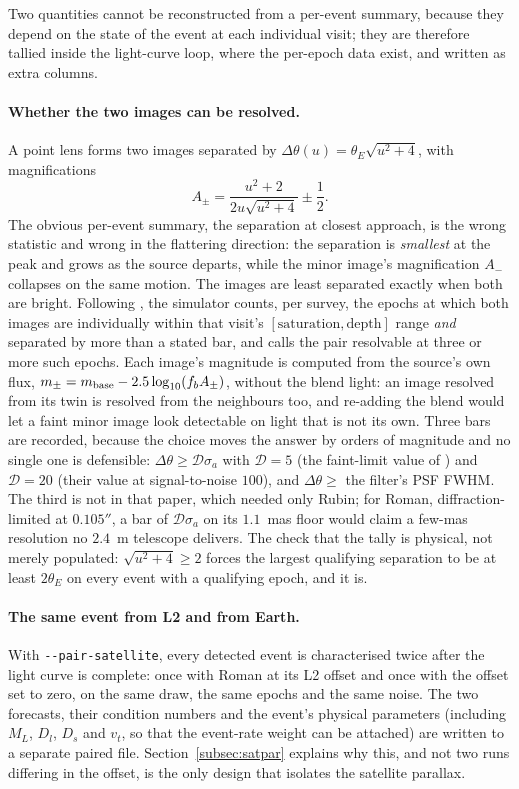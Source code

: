 \documentclass[english,10pt,a4paper]{article}
\begin{document}
	Two quantities cannot be reconstructed from a per-event summary, because they depend on the state of the event at each individual visit; they are therefore tallied inside the light-curve loop, where the per-epoch data exist, and written as extra columns.

	\paragraph{Whether the two images can be resolved.} A point lens forms two images separated by $\Delta\theta(u) = \theta_E\sqrt{u^2+4}$, with magnifications
	\[
		A_\pm = \frac{u^2+2}{2u\sqrt{u^2+4}} \pm \frac{1}{2} .
	\]
	The obvious per-event summary, the separation at closest approach, is the wrong statistic and wrong in the flattering direction: the separation is \emph{smallest} at the peak and grows as the source departs, while the minor image's magnification $A_-$ collapses on the same motion. The images are least separated exactly when both are bright. Following \cite{SajadianMakler2026}, the simulator counts, per survey, the epochs at which both images are individually within that visit's $[\text{saturation}, \text{depth}]$ range \emph{and} separated by more than a stated bar, and calls the pair resolvable at three or more such epochs. Each image's magnitude is computed from the source's own flux, $m_\pm = m_{\rm base} - 2.5\log_{10}(f_b A_\pm)$, without the blend light: an image resolved from its twin is resolved from the neighbours too, and re-adding the blend would let a faint minor image look detectable on light that is not its own. Three bars are recorded, because the choice moves the answer by orders of magnitude and no single one is defensible: $\Delta\theta \ge \mathcal{D}\sigma_a$ with $\mathcal{D} = 5$ (the faint-limit value of \cite{SajadianMakler2026}) and $\mathcal{D} = 20$ (their value at signal-to-noise $100$), and $\Delta\theta \ge$ the filter's PSF FWHM. The third is not in that paper, which needed only Rubin; for Roman, diffraction-limited at $0.105''$, a bar of $\mathcal{D}\sigma_a$ on its $1.1$~mas floor would claim a few-mas resolution no $2.4$~m telescope delivers. The check that the tally is physical, not merely populated: $\sqrt{u^2+4}\ge2$ forces the largest qualifying separation to be at least $2\theta_E$ on every event with a qualifying epoch, and it is.

	\paragraph{The same event from L2 and from Earth.} With \texttt{-{}-pair-satellite}, every detected event is characterised twice after the light curve is complete: once with Roman at its L2 offset and once with the offset set to zero, on the same draw, the same epochs and the same noise. The two forecasts, their condition numbers and the event's physical parameters (including $M_L$, $D_l$, $D_s$ and $v_t$, so that the event-rate weight can be attached) are written to a separate paired file. Section~\ref{subsec:satpar} explains why this, and not two runs differing in the offset, is the only design that isolates the satellite parallax.
\end{document}
